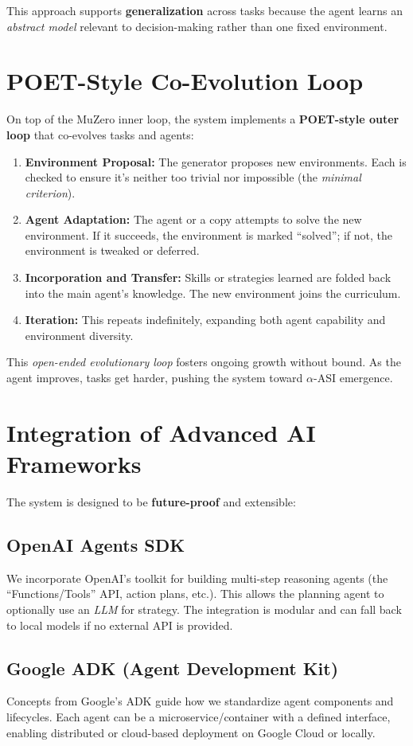 \documentclass{article}
\begin{document}
This approach supports \textbf{generalization} across tasks because the agent learns an \emph{abstract model} relevant to decision-making rather than one fixed environment.

\section{POET-Style Co-Evolution Loop}
On top of the MuZero inner loop, the system implements a \textbf{POET-style outer loop} that co-evolves tasks and agents:

\begin{enumerate}
  \item \textbf{Environment Proposal:} The generator proposes new environments. Each is checked to ensure it’s neither too trivial nor impossible (the \emph{minimal criterion}).
  \item \textbf{Agent Adaptation:} The agent or a copy attempts to solve the new environment. If it succeeds, the environment is marked “solved”; if not, the environment is tweaked or deferred.
  \item \textbf{Incorporation and Transfer:} Skills or strategies learned are folded back into the main agent’s knowledge. The new environment joins the curriculum.
  \item \textbf{Iteration:} This repeats indefinitely, expanding both agent capability and environment diversity. 
\end{enumerate}

This \emph{open-ended evolutionary loop} fosters ongoing growth without bound. As the agent improves, tasks get harder, pushing the system toward \(\alpha\)-ASI emergence.

\section{Integration of Advanced AI Frameworks}
The system is designed to be \textbf{future-proof} and extensible:

\subsection{OpenAI Agents SDK}
We incorporate OpenAI’s toolkit for building multi-step reasoning agents (the “Functions/Tools” API, action plans, etc.). This allows the planning agent to optionally use an \emph{LLM} for strategy. The integration is modular and can fall back to local models if no external API is provided.

\subsection{Google ADK (Agent Development Kit)}
Concepts from Google’s ADK guide how we standardize agent components and lifecycles. Each agent can be a microservice/container with a defined interface, enabling distributed or cloud-based deployment on Google Cloud or locally.
\end{document}
